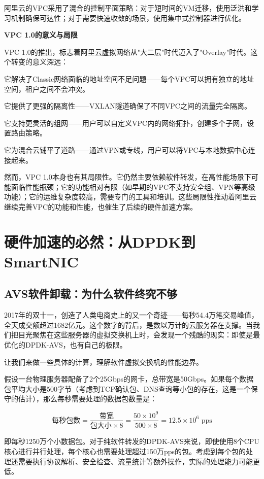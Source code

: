 阿里云的VPC采用了混合的控制平面策略：对于短时间的VM迁移，使用泛洪和学习机制确保可达性；对于需要快速收敛的场景，使用集中式控制器进行优化。

\textbf{VPC 1.0的意义与局限}

VPC 1.0的推出，标志着阿里云虚拟网络从"大二层"时代迈入了"Overlay"时代。这个转变的意义深远：

它解决了Classic网络面临的地址空间不足问题——每个VPC可以拥有独立的地址空间，租户之间不会冲突。

它提供了更强的隔离性——VXLAN隧道确保了不同VPC之间的流量完全隔离。

它支持更灵活的组网——用户可以自定义VPC内的网络拓扑，创建多个子网，设置路由策略。

它为混合云铺平了道路——通过VPN或专线，用户可以将VPC与本地数据中心连接起来。

然而，VPC 1.0本身也有其局限性。它仍然主要依赖软件转发，在高性能场景下可能面临性能瓶颈；它的功能相对有限（如早期的VPC不支持安全组、VPN等高级功能）；它的运维复杂度较高，需要专门的工具和培训。这些局限性推动着阿里云继续完善VPC的功能和性能，也催生了后续的硬件加速方案。

\section{硬件加速的必然：从DPDK到SmartNIC}

\subsection{AVS软件卸载：为什么软件终究不够}

2017年的双十一，创造了人类电商史上的又一个奇迹——每秒54.4万笔交易峰值，全天成交额超过1682亿元。这个数字的背后，是数以万计的云服务器在支撑。当我们把目光聚焦在这些服务器的虚拟交换机上时，会发现一个残酷的现实：即使是最优化的DPDK-AVS，也有自己的极限。

让我们来做一些具体的计算，理解软件虚拟交换机的性能边界。

假设一台物理服务器配备了2个25Gbps的网卡，总带宽是50Gbps。如果每个数据包平均大小是500字节（考虑到TCP确认包、DNS查询等小包的存在，这是一个保守的估计），那么每秒需要处理的数据包数量是：

\[
\text{每秒包数} = \frac{\text{带宽}}{\text{包大小} \times 8} = \frac{50 \times 10^9}{500 \times 8} = 12.5 \times 10^6 \text{ pps}
\]

即每秒1250万个小数据包。对于纯软件转发的DPDK-AVS来说，即使使用8个CPU核心进行并行处理，每个核心也需要处理超过150万pps的包。考虑到每个包的处理还需要执行协议解析、安全检查、流量统计等额外操作，实际的处理能力可能更低。

